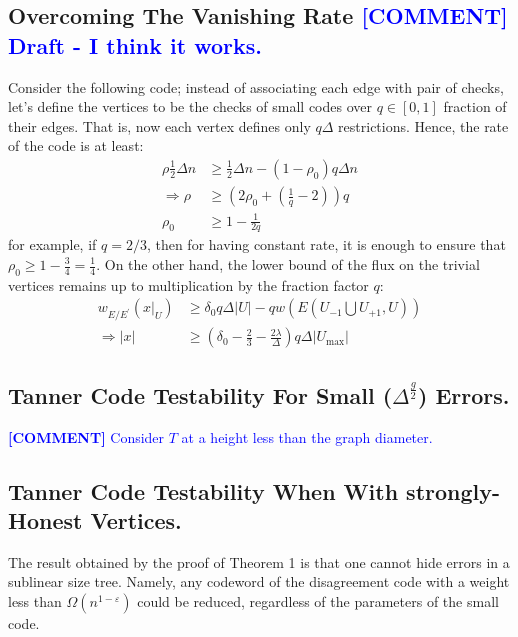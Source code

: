 \documentclass{article}
\newcommand{\commentt}[1]{\textcolor{blue}{ \textbf{[COMMENT]} #1}}
\newcommand{\ctt}[1]{\commentt{#1}}
\begin{document}
\begin{multicols*}{2}
  \subsection { Overcoming The Vanishing Rate \ctt{ Draft - I think it works.} } 
  Consider the following code; instead of associating each edge with pair of checks, let's define the vertices to be the checks of small codes over $q \in [0,1]$ fraction of their edges. That is, now each vertex defines only $q\Delta$ restrictions. Hence, the rate of the code is at least:   
  \begin{equation*}
    \begin{split}
      \rho\frac{1}{2}\Delta n & \ge \frac{1}{2}\Delta n - \left(1 - \rho_{0} \right)q\Delta n \\
      \Rightarrow \rho & \ge \left(  2\rho_{0} + \left( \frac{1}{q}  - 2  \right)  \right)q \\ 
      \rho_{0} & \ge  1 - \frac{1}{2q} 
    \end{split}
  \end{equation*} for example, if $q = 2/3$, then for having constant rate, it is enough to ensure that $ \rho_{0} \ge 1 - \frac{3}{4} = \frac{1}{4}$. On the other hand, the lower bound of the flux on the trivial vertices remains up to multiplication by the fraction factor $q$: 
  \begin{equation*}
    \begin{split}
      w_{E/E^{\prime}}\left( x|_{U} \right) & \ge  \delta_{0}q\Delta|U| -qw\left( E(U_{-1} \bigcup U_{+1} ,U)  \right) \\ 
      \Rightarrow |x| & \ge \left(  \delta_{0} - \frac{2}{3} - \frac{2\lambda}{\Delta} \right) q \Delta|U_{\max}|
    \end{split}
  \end{equation*}

  \subsection{Tanner Code Testability For Small ($ \Delta^{\frac{g}{2}} $) Errors.} 
  \ctt{Consider $T$ at a height less than the graph diameter.  } 
  \subsection{Tanner Code Testability When With strongly-Honest Vertices. }
  The result obtained by the proof of Theorem 1 is that one cannot hide errors in a sublinear size tree. Namely, any codeword of the disagreement code with a weight less than $ \Omega \left( n^{1-\varepsilon} \right) $ could be reduced, regardless of the parameters of the small code. 

\end{multicols*}
\end{document}
